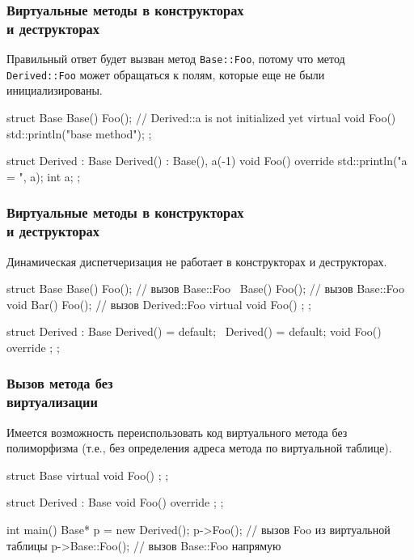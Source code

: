 \documentclass[compress, 8pt, aspectratio=169]{beamer}
\begin{document}
\begin{frame}[fragile]

    \frametitle{Виртуальные методы в конструкторах \\ и деструкторах}

    Правильный ответ \textemdash \space будет вызван метод \verb|Base::Foo|,
    потому что метод \verb|Derived::Foo| может обращаться к полям, которые
    еще не были инициализированы.

    \begin{myinplacelisting}[minted language=cpp]
struct Base {
    Base() {
        Foo(); // Derived::a is not initialized yet
    }
    virtual void Foo() { std::println("base method"); }
};

struct Derived : Base {
    Derived() : Base(), a(-1) {}
    void Foo() override { std::println("a = {}", a); }
    int a;
};
    \end{myinplacelisting}

\end{frame}

\begin{frame}[fragile]

    \frametitle{Виртуальные методы в конструкторах \\ и деструкторах}

    Динамическая диспетчеризация
    не работает в конструкторах и деструкторах.

    \begin{myinplacelisting}[minted language=cpp]
struct Base {
    Base() { Foo(); } // вызов Base::Foo
    ~Base() { Foo(); } // вызов Base::Foo
    void Bar() { Foo(); } // вызов Derived::Foo
    virtual void Foo() {};
};

struct Derived : Base {
    Derived() = default;
    ~Derived() = default;
    void Foo() override {};
};
    \end{myinplacelisting}

\end{frame}

\begin{frame}[fragile]

    \frametitle{Вызов метода без \\ виртуализации}

    Имеется возможность переиспользовать код виртуального метода без
    полиморфизма (т.е., без определения адреса метода по виртуальной таблице).

    \begin{myinplacelisting}[minted language=cpp]
struct Base {
    virtual void Foo() {};
};

struct Derived : Base {
    void Foo() override {};
};

int main() {
    Base* p = new Derived();
    p->Foo(); // вызов Foo из виртуальной таблицы
    p->Base::Foo(); // вызов Base::Foo напрямую
}
    \end{myinplacelisting}

\end{frame}
\end{document}
